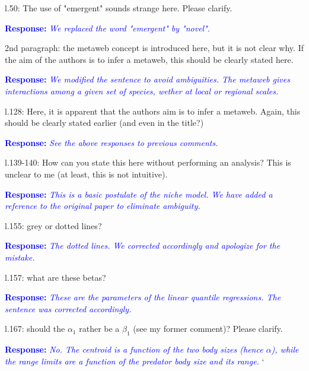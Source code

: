 \documentclass [12pt,onecolumn,twoside,openright]{report}
\begin{document}
\begin{onehalfspacing}
\medskip l.50: The use of "emergent" sounds strange here.
Please clarify.

\medskip\textcolor{blue}{\textbf{Response:}} \textit{\textcolor{blue}{ We replaced the word "emergent" by "novel".}}

\medskip 2nd paragraph: the metaweb concept is introduced
here, but it is not clear why. If the aim of the authors is to infer a metaweb,
this should be clearly stated here.

\medskip\textcolor{blue}{\textbf{Response:}} \textit{\textcolor{blue}{We modified the sentence to avoid ambiguities. The metaweb gives interactions among a given set of species, wether at local or regional scales.}}

\medskip l.128: Here, it is apparent that the authors aim is
to infer a metaweb. Again, this should be clearly stated earlier (and even in
the title?)

\medskip\textcolor{blue}{\textbf{Response:}} \textit{\textcolor{blue}{See the above responses to previous comments.}}

\medskip l.139-140: How can you state this here without
performing an analysis? This is unclear to me (at least, this is not intuitive).

\medskip \textcolor{blue}{\textbf{Response:}} \textit{\textcolor{blue}{This is a basic
postulate of the niche model. We have added a reference to the original paper to
eliminate ambiguity.}}

\medskip l.155: grey or dotted lines?

\medskip\textcolor{blue}{\textbf{Response:}} \textit{\textcolor{blue}{The
  \emph{dotted} lines. We corrected accordingly and apologize for the mistake.}}

\medskip l.157: what are these betas?

\medskip\textcolor{blue}{\textbf{Response:}} \textit{\textcolor{blue}{These are the parameters of the linear quantile regressions. The sentence was corrected accordingly.}}

\medskip l.167: should the $\alpha_1$ rather be a $\beta_1$
(see my former comment)? Please clarify.


\medskip\textcolor{blue}{\textbf{Response:}} \textit{\textcolor{blue}{No. The centroid
is a function of the two body sizes (hence $\alpha$), while the range limits are
a function of the predator body size and its range.}}
`
\medskip 


\end{onehalfspacing}
\end{document}
